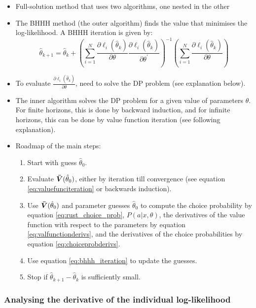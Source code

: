 \documentclass[11pt]{article}
\begin{document}
\begin{itemize}
    \item Full-solution method that uses two algorithms, one nested in the other
    \item The BHHH method (the outer algorithm) finds the value that minimises the log-likelihood. A BHHH iteration is given by:
    \begin{equation} \label{eq:bhhh_iteration}
        \hat{\theta}_{k+1} = \hat{\theta}_{k} + \left( \sum_{i=1}^N \frac{\partial \ell_i(\hat{\theta}_k)}{\partial \theta} \frac{\partial \ell_i(\hat{\theta}_k)}{\partial \theta^\prime} \right)^{-1} \left(\sum_{i=1}^N \frac{\partial \ell_i(\hat{\theta}_k)}{\partial \theta} \right)
    \end{equation}
    \item To evaluate $\frac{\partial \ell_i(\hat{\theta}_k)}{\partial \theta}$, need to solve the DP problem (see explanation below).
    \item The inner algorithm solves the DP problem for a given value of parameters $\theta$. For finite horizons, this is done by backward induction, and for infinite horizons, this can be done by value function iteration (see following explanation).
    \item Roadmap of the main steps:
    \begin{enumerate}
        \item Start with guess $\hat{\theta}_0$.
        \item Evaluate $\bm{\Bar{V}}(\hat{\theta}_0)$, either by iteration till convergence (see equation \ref{eq:valuefunciteration} or backwards induction).
        \item Use $\bm{\Bar{V}}(\hat{\theta}_0)$ and parameter guesses $\hat{\theta}_0$ to compute the choice probability by equation \ref{eq:rust_choice_prob}, $P(a|x,\theta)$, the derivatives of the value function with respect to the parameters by equation \ref{eq:valfunctionderivs}, and the derivatives of the choice probabilities by equation \ref{eq:choiceprobderivs}.
        \item Use equation \ref{eq:bhhh_iteration} to update the guesses.
        \item Stop if $\hat{\theta}_{k+1} - \hat{\theta}_k$ is sufficiently small.
    \end{enumerate}
\end{itemize}

\subsubsection{Analysing the derivative of the individual log-likelihood}
\end{document}
